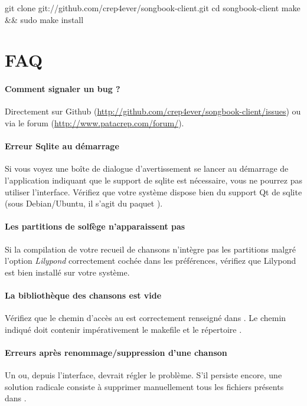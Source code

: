 \begin{unix}
  git clone git://github.com/crep4ever/songbook-client.git
  cd songbook-client
  make && sudo make install
\end{unix}

\subsection{\windows}


\section{FAQ}

\paragraph{Comment signaler un bug ?}
Directement sur Github
(\url{http://github.com/crep4ever/songbook-client/issues}) ou via le
forum (\url{http://www.patacrep.com/forum/}).

\paragraph{Erreur Sqlite au démarrage} 
Si vous voyez une boîte de dialogue d'avertissement se lancer au
démarrage de l'application indiquant que le support de sqlite est
nécessaire, vous ne pourrez pas utiliser l'interface. Vérifiez que
votre système dispose bien du support Qt de sqlite (sous
Debian/Ubuntu, il s'agit du paquet ).

\paragraph{Les partitions de solfège n'apparaissent pas}
Si la compilation de votre recueil de chansons n'intègre pas les
partitions malgré l'option \emph{Lilypond} correctement cochée dans les
préférences, vérifiez que Lilypond est bien installé sur votre système. 

\paragraph{La bibliothèque des chansons est vide} 
Vérifiez que le chemin d'accès au \recueil{} est correctement
renseigné dans . Le chemin indiqué doit contenir
impérativement le makefile et le répertoire .

\paragraph{Erreurs après renommage/suppression d'une chanson} 
Un  ou, depuis l'interface,  devrait
régler le problème. S'il persiste encore, une solution radicale
consiste à supprimer manuellement tous les fichiers  présents
dans .
